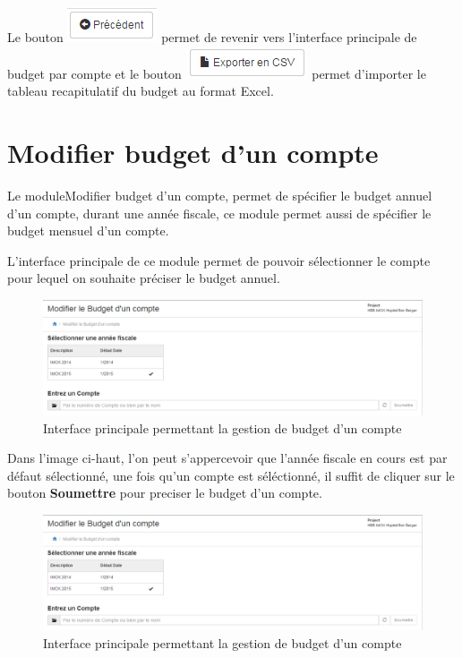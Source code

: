 \documentclass[12pt,a4paper]{report}
\begin{document}
Le bouton \includegraphics[scale=0.7]{pic/PrecedentBudget.png} permet de revenir vers l'interface principale de budget par compte et le bouton \includegraphics[scale=0.7]{pic/ExportCVS.png} permet d'importer le tableau recapitulatif du budget au format Excel.


\section{Modifier budget d'un compte}
Le moduleModifier budget d'un compte, permet de spécifier le budget annuel d'un compte, durant une année fiscale, ce module permet aussi de spécifier le budget mensuel d'un compte.

L'interface principale de ce module permet de pouvoir sélectionner le compte pour lequel on souhaite préciser le budget annuel.

\begin{figure}[h]
\begin{center}
\includegraphics[width=12cm]{pic/ModifierBudgCompte.png}
\end{center}
\caption{Interface principale permettant la gestion de budget d'un compte}
\label{Interface principale permettant la gestion de budget d'un compte}
\end{figure}

Dans l'image ci-haut, l'on peut s'appercevoir que l'année fiscale en cours est par défaut sélectionné, une fois qu'un compte est séléctionné, il suffit de cliquer sur le bouton \textbf{Soumettre} pour preciser le budget d'un compte. 

\begin{figure}[h]
\begin{center}
\includegraphics[width=12cm]{pic/ModifierBudgCompte.png}
\end{center}
\caption{Interface principale permettant la gestion de budget d'un compte}
\label{Interface principale permettant la gestion de budget d'un compte}
\end{figure}
\end{document}
